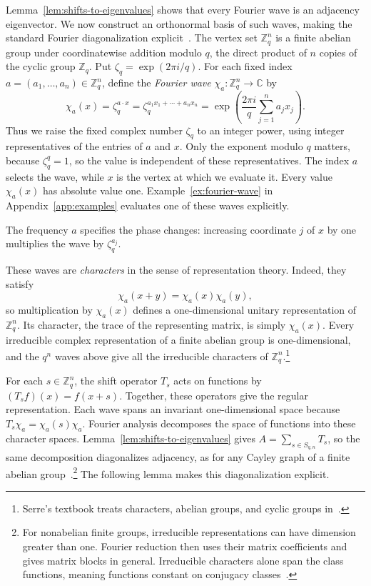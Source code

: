 \documentclass[11pt,a4paper]{article}
\numberwithin{equation}{section}
\numberwithin{figure}{section}
\numberwithin{table}{section}
\numberwithin{footnote}{section}
\theoremstyle{informal}\newtheorem*{informaltheorem}{Informal theorem}
\theoremstyle{definition}\newtheorem{example}{Example}[section]
\theoremstyle{remark}\newtheorem{remark}[theorem]{Remark}
\newcommand{\Z}{\mathbb Z}
\newcommand{\C}{\mathbb C}
\begin{document}
Lemma~\ref{lem:shifts-to-eigenvalues} shows that every Fourier wave
is an adjacency eigenvector. We now construct an orthonormal basis
of such waves, making the standard Fourier diagonalization
explicit~\cite[Lemma~2.3]{cao}.
The vertex set \(\Z_q^n\) is a finite abelian group under
coordinatewise addition modulo \(q\), the direct product of \(n\)
copies of the cyclic group \(\Z_q\).
Put \(\zeta_q=\exp(2\pi i/q)\). For each fixed index
\(a=(a_1,\ldots,a_n)\in\Z_q^n\), define the \emph{Fourier wave}
\(\chi_a:\Z_q^n\to\C\) by
\begin{equation}
 \chi_a(x)=\zeta_q^{a\cdot x}
 =\zeta_q^{a_1x_1+\cdots+a_nx_n}
 =\exp\!\left(\frac{2\pi i}{q}\sum_{j=1}^n a_jx_j\right).
\end{equation}
Thus we raise the fixed complex number \(\zeta_q\) to an integer
power, using integer representatives of the entries of \(a\) and
\(x\). Only the exponent modulo \(q\) matters, because
\(\zeta_q^q=1\), so the value is independent of these representatives.
The index \(a\) selects the wave, while \(x\) is the vertex at
which we evaluate it. Every value \(\chi_a(x)\) has absolute value one. Example~\ref{ex:fourier-wave} in Appendix~\ref{app:examples}
evaluates one of these waves explicitly.

The frequency \(a\) specifies the phase changes: increasing
coordinate \(j\) of \(x\) by one multiplies the wave by
\(\zeta_q^{a_j}\).

These waves are \emph{characters} in the sense of representation
theory. Indeed, they satisfy
\begin{equation}
 \chi_a(x+y)=\chi_a(x)\chi_a(y),
\end{equation}
so multiplication by \(\chi_a(x)\) defines a one-dimensional unitary
representation of \(\Z_q^n\). Its character, the trace of the
representing matrix, is simply \(\chi_a(x)\).
Every irreducible complex representation of a finite abelian group
is one-dimensional, and the \(q^n\) waves above give all the
irreducible characters of \(\Z_q^n\).\footnote{Serre's textbook treats
characters, abelian groups, and cyclic groups
in~\cite[Secs.~2.1, 3.1, and~5.1]{serre}.}

For each \(s\in\Z_q^n\), the shift operator \(T_s\) acts on
functions by \((T_s f)(x)=f(x+s)\). Together, these operators
give the regular representation. Each wave spans an invariant
one-dimensional space because \(T_s\chi_a=\chi_a(s)\chi_a\).
Fourier analysis decomposes the space of functions into these
character spaces. Lemma~\ref{lem:shifts-to-eigenvalues} gives
\(A=\sum_{s\in S_{q,n}}T_s\), so the same decomposition diagonalizes
adjacency, as for any Cayley graph of
a finite abelian group~\cite[Sec.~1.4.9]{bh}.\footnote{For nonabelian
finite groups, irreducible representations can have
dimension greater than one. Fourier reduction then uses their matrix
coefficients and gives matrix blocks in general. Irreducible
characters alone span the class functions, meaning functions constant
on conjugacy classes~\cite[Secs.~2.2--2.5]{serre}.}
The following lemma makes this diagonalization explicit.
\end{document}
